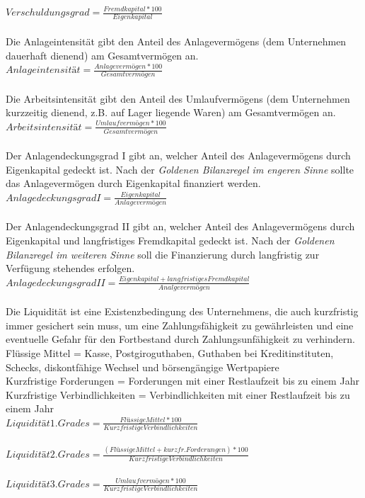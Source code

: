 $Verschuldungsgrad = \frac{Fremdkapital * 100}{Eigenkapital}$\\
\\
Die Anlageintensität gibt den Anteil des Anlagevermögens (dem Unternehmen dauerhaft dienend) am Gesamtvermögen an.\\
$Anlageintensität = \frac{Anlagevermögen * 100}{Gesamtvermögen}$\\
\\
Die Arbeitsintensität gibt den Anteil des Umlaufvermögens (dem Unternehmen kurzzeitig dienend, z.B. auf Lager liegende Waren) am Gesamtvermögen an.\\
$Arbeitsintensität = \frac{Umlaufvermögen * 100}{Gesamtvermögen}$\\
\\
Der Anlagendeckungsgrad I gibt an, welcher Anteil des Anlagevermögens durch Eigenkapital gedeckt ist. Nach der {\it Goldenen Bilanzregel im engeren Sinne} sollte das Anlagevermögen durch Eigenkapital finanziert werden.\\
$Anlagedeckungsgrad I = \frac{Eigenkapital}{Anlagevermögen}$\\
\\
Der Anlagendeckungsgrad II gibt an, welcher Anteil des Anlagevermögens durch Eigenkapital und langfristiges Fremdkapital gedeckt ist. Nach der {\it Goldenen Bilanzregel im weiteren Sinne} soll die Finanzierung durch langfristig zur Verfügung stehendes erfolgen.\\
$Anlagedeckungsgrad II = \frac{Eigenkapital + langfristiges Fremdkapital}{Analgevermögen}$\\
\\
Die Liquidität ist eine Existenzbedingung des Unternehmens, die auch kurzfristig immer gesichert sein muss, um eine Zahlungsfähigkeit zu gewährleisten und eine eventuelle Gefahr für den Fortbestand durch Zahlungsunfähigkeit zu verhindern.\\
Flüssige Mittel = Kasse, Postgiroguthaben, Guthaben bei Kreditinstituten, Schecks, diskontfähige Wechsel und börsengängige Wertpapiere\\
Kurzfristige Forderungen = Forderungen mit einer Restlaufzeit bis zu einem Jahr\\
Kurzfristige Verbindlichkeiten = Verbindlichkeiten mit einer Restlaufzeit bis zu einem Jahr\\

$Liquidität 1. Grades = \frac{Flüssige Mittel * 100}{Kurzfristige Verbindlichkeiten}$\\
\\
$Liquidität 2. Grades = \frac{(Flüssige Mittel + kurzfr. Forderungen) * 100}{Kurzfristige Verbindlichkeiten}$\\
\\
$Liquidität 3. Grades = \frac{Umlaufvermögen * 100}{Kurzfristige Verbindlichkeiten}$\\

